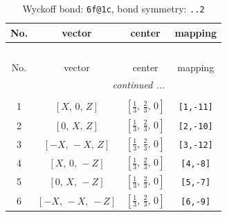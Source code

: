 \documentclass[fleqn,8pt]{jsarticle}
\begin{document}
\begin{longtable}{cccc}
\caption{Wyckoff bond: {\tt 6f@1c}, bond symmetry: {\tt ..2}}
 \\
 \hline \hline
No. & vector & center & mapping \\ \hline \endfirsthead

\multicolumn{3}{l}{\tablename\ \thetable{}} \\
 \hline \hline
No. & vector & center & mapping \\ \hline \endhead

 \hline \hline
\multicolumn{3}{r}{\footnotesize\it continued ...} \\ \endfoot

 \hline \hline
\multicolumn{3}{r}{} \\ \endlastfoot

1 & $\left[ X,\, 0,\, Z \right]$ & $\left[ \frac{1}{3},\, \frac{2}{3},\, 0 \right]$ & {\tt [1,-11]} \\ \hline
2 & $\left[ 0,\, X,\, Z \right]$ & $\left[ \frac{1}{3},\, \frac{2}{3},\, 0 \right]$ & {\tt [2,-10]} \\ \hline
3 & $\left[ - X,\, - X,\, Z \right]$ & $\left[ \frac{1}{3},\, \frac{2}{3},\, 0 \right]$ & {\tt [3,-12]} \\ \hline
4 & $\left[ X,\, 0,\, - Z \right]$ & $\left[ \frac{1}{3},\, \frac{2}{3},\, 0 \right]$ & {\tt [4,-8]} \\ \hline
5 & $\left[ 0,\, X,\, - Z \right]$ & $\left[ \frac{1}{3},\, \frac{2}{3},\, 0 \right]$ & {\tt [5,-7]} \\ \hline
6 & $\left[ - X,\, - X,\, - Z \right]$ & $\left[ \frac{1}{3},\, \frac{2}{3},\, 0 \right]$ & {\tt [6,-9]} \\
\end{longtable}
\renewcommand{\arraystretch}{1.2}
\end{document}

